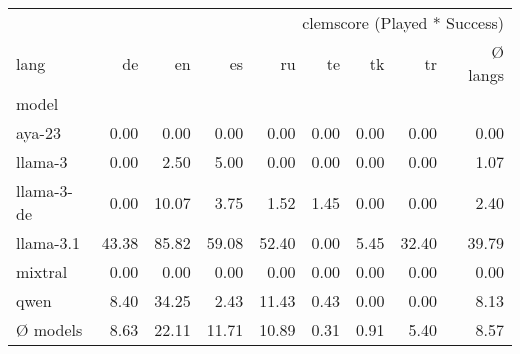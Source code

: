 \begin{tabular}{lrrrrrrrr}
\toprule
 & \multicolumn{8}{r}{clemscore (Played * Success)} \\
lang & de & en & es & ru & te & tk & tr & Ø langs \\
model &  &  &  &  &  &  &  &  \\
\midrule
aya-23 & 0.00 & 0.00 & 0.00 & 0.00 & 0.00 & 0.00 & 0.00 & 0.00 \\
llama-3 & 0.00 & 2.50 & 5.00 & 0.00 & 0.00 & 0.00 & 0.00 & 1.07 \\
llama-3-de & 0.00 & 10.07 & 3.75 & 1.52 & 1.45 & 0.00 & 0.00 & 2.40 \\
llama-3.1 & 43.38 & 85.82 & 59.08 & 52.40 & 0.00 & 5.45 & 32.40 & 39.79 \\
mixtral & 0.00 & 0.00 & 0.00 & 0.00 & 0.00 & 0.00 & 0.00 & 0.00 \\
qwen & 8.40 & 34.25 & 2.43 & 11.43 & 0.43 & 0.00 & 0.00 & 8.13 \\
Ø models & 8.63 & 22.11 & 11.71 & 10.89 & 0.31 & 0.91 & 5.40 & 8.57 \\
\bottomrule
\end{tabular}
